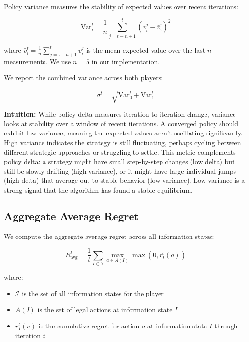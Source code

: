 \documentclass[11pt]{article}
\begin{document}
Policy variance measures the stability of expected values over recent iterations:

\begin{equation}
\text{Var}_i^t = \frac{1}{n} \sum_{j=t-n+1}^{t} (v_i^j - \bar{v}_i^t)^2
\end{equation}

where $\bar{v}_i^t = \frac{1}{n}\sum_{j=t-n+1}^{t} v_i^j$ is the mean expected value over the last $n$ measurements. We use $n=5$ in our implementation.

We report the combined variance across both players:

\begin{equation}
\sigma^t = \sqrt{\text{Var}_0^t + \text{Var}_1^t}
\end{equation}

\textbf{Intuition:} While policy delta measures iteration-to-iteration change, variance looks at stability over a window of recent iterations. A converged policy should exhibit low variance, meaning the expected values aren't oscillating significantly. High variance indicates the strategy is still fluctuating, perhaps cycling between different strategic approaches or struggling to settle. This metric complements policy delta: a strategy might have small step-by-step changes (low delta) but still be slowly drifting (high variance), or it might have large individual jumps (high delta) that average out to stable behavior (low variance). Low variance is a strong signal that the algorithm has found a stable equilibrium.

\subsection{Aggregate Average Regret}

We compute the aggregate average regret across all information states:

\begin{equation}
R^t_{\text{avg}} = \frac{1}{t} \sum_{I \in \mathcal{I}} \max_{a \in A(I)} \max\left(0, r^t_I(a)\right)
\end{equation}

where:
\begin{itemize}
    \item $\mathcal{I}$ is the set of all information states for the player
    \item $A(I)$ is the set of legal actions at information state $I$
    \item $r^t_I(a)$ is the cumulative regret for action $a$ at information state $I$ through iteration $t$
\end{itemize}
\end{document}
